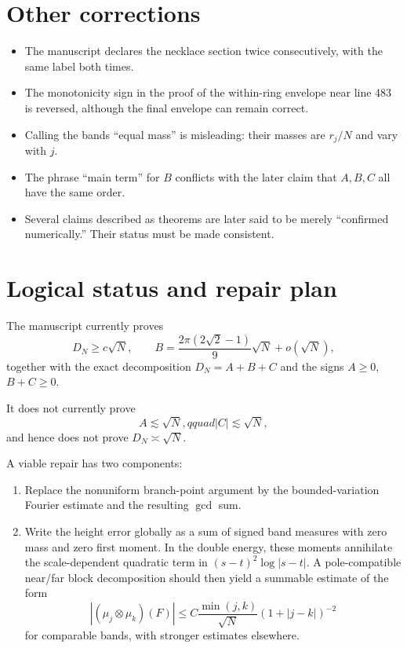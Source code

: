 \documentclass[11pt]{article}
\begin{document}
\section{Other corrections}

\begin{itemize}
\item The manuscript declares the necklace section twice consecutively, with
the same label both times.
\item The monotonicity sign in the proof of the within-ring envelope near
line 483 is reversed, although the final envelope can remain correct.
\item Calling the bands ``equal mass'' is misleading: their masses are
$r_j/N$ and vary with $j$.
\item The phrase ``main term'' for $B$ conflicts with the later claim that
$A,B,C$ all have the same order.
\item Several claims described as theorems are later said to be merely
``confirmed numerically.''  Their status must be made consistent.
\end{itemize}

\section{Logical status and repair plan}

The manuscript currently proves
\[
 D_N\ge c\sqrt N,
 \qquad
 B=\frac{2\pi(2\sqrt2-1)}9\sqrt N+o(\sqrt N),
\]
together with the exact decomposition $D_N=A+B+C$ and the signs
$A\ge0$, $B+C\ge0$.

It does not currently prove
\[
 A\lesssim\sqrt N,qquad |C|\lesssim\sqrt N,
\]
and hence does not prove $D_N\asymp\sqrt N$.

A viable repair has two components:
\begin{enumerate}
\item Replace the nonuniform branch-point argument by the bounded-variation
Fourier estimate and the resulting $\gcd$ sum.
\item Write the height error globally as a sum of signed band measures with
zero mass and zero first moment.  In the double energy, these moments
annihilate the scale-dependent quadratic term in
$(s-t)^2\log|s-t|$.  A pole-compatible near/far block decomposition should
then yield a summable estimate of the form
\[
 |(\mu_j\otimes\mu_k)(F)|
 \le C\frac{\min(j,k)}{\sqrt N}(1+|j-k|)^{-2}
\]
for comparable bands, with stronger estimates elsewhere.
\end{enumerate}
\end{document}
